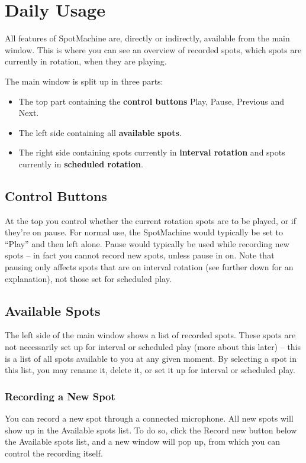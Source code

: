 \documentclass[a4paper,12pt]{report}
\begin{document}
\chapter{Daily Usage}
All features of SpotMachine are, directly or indirectly, available from the main window. This is where you can see an overview of recorded spots, which spots are currently in rotation, when they are playing.

The main window is split up in three parts:
\begin{itemize}
\item The top part containing the {\bf control buttons} Play, Pause, Previous and Next.
\item The left side containing all {\bf available spots}.
\item The right side containing spots currently in {\bf interval rotation} and spots currently in {\bf scheduled rotation}.
\end{itemize}

\section{Control Buttons}
At the top you control whether the current rotation spots are to be played, or if they're on pause. For normal use, the SpotMachine would typically be set to ``Play'' and then left alone. Pause would typically be used while recording new spots -- in fact you cannot record new spots, unless pause in on. Note that pausing only affects spots that are on interval rotation (see further down for an explanation), not those set for scheduled play. %

\section{Available Spots}
The left side of the main window shows a list of recorded spots. These spots are not necessarily set up for interval or scheduled play (more about this later) -- this is a list of all spots available to you at any given moment. By selecting a spot in this list, you may rename it, delete it, or set it up for interval or scheduled play.

\subsection{Recording a New Spot}
You can record a new spot through a connected microphone. All new spots will show up in the Available spots list. To do so, click the Record new button below the Available spots list, and a new window will pop up, from which you can control the recording itself.
\end{document}
